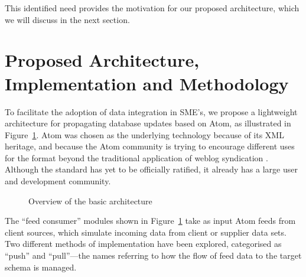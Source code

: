 \documentclass{CRPITStyle}
\begin{document}
This identified need provides the motivation for our proposed
architecture, which we will discuss in the next section.


\section{Proposed Architecture, Implementation and Methodology}
\label{sec-architecture}

To facilitate the adoption of data integration in SME's, we propose a
lightweight architecture for propagating database updates based on Atom,
as illustrated in Figure~\ref{fig-basic}. Atom was chosen as the
underlying technology because of its XML heritage, and because the Atom
community is trying to encourage different uses for the format beyond
the traditional application of weblog syndication
\cite{Nott-M-2005-Atom}. Although the standard has yet to be officially
ratified, it already has a large user and development community.

\begin{figure}[htb]
	\caption{Overview of the basic architecture}
	\label{fig-basic}
\end{figure}

The ``feed consumer'' modules shown in Figure~\ref{fig-basic} take as
input Atom feeds from client sources, which simulate incoming data from
client or supplier data sets. Two different methods of implementation
have been explored, categorised as ``push'' and ``pull''---the names
referring to how the flow of feed data to the target schema is managed.
\end{document}
